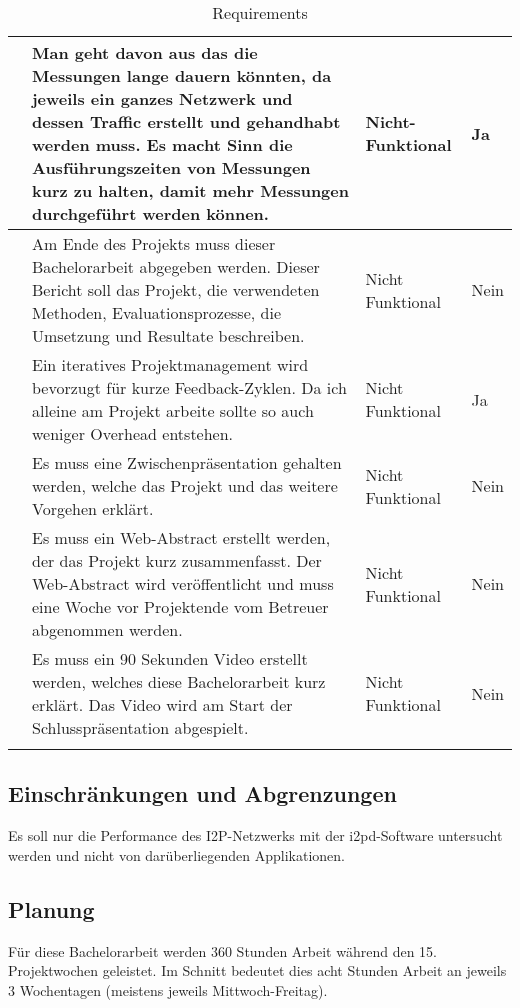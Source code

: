 \begin{longtable}{N p{8.5cm} l l}
      & Man geht davon aus das die Messungen lange dauern könnten, da jeweils ein ganzes Netzwerk und dessen Traffic erstellt und gehandhabt werden muss. Es macht Sinn die Ausführungszeiten von Messungen kurz zu halten, damit mehr Messungen durchgeführt werden können. & Nicht-Funktional & Ja \\ \midrule
      & Am Ende des Projekts muss dieser Bachelorarbeit abgegeben werden. Dieser Bericht soll das Projekt, die verwendeten Methoden, Evaluationsprozesse, die Umsetzung und Resultate beschreiben.
                & Nicht Funktional & Nein \\ \midrule
      & Ein iteratives Projektmanagement wird bevorzugt für kurze Feedback-Zyklen. Da ich alleine am Projekt arbeite sollte so auch weniger Overhead entstehen. & Nicht Funktional & Ja \\ \midrule
      & Es muss eine Zwischenpräsentation gehalten werden, welche das Projekt und das weitere Vorgehen erklärt.
                & Nicht Funktional & Nein \\ \midrule
      & Es muss ein Web-Abstract erstellt werden, der das Projekt kurz zusammenfasst. Der Web-Abstract wird veröffentlicht und muss eine Woche vor Projektende vom Betreuer abgenommen werden.
                & Nicht Funktional & Nein \\ \midrule
      & Es muss ein 90 Sekunden Video erstellt werden, welches diese Bachelorarbeit kurz erklärt. Das Video wird am Start der Schlusspräsentation abgespielt.
                & Nicht Funktional & Nein \\ \midrule
    \bottomrule
    \caption{Requirements}\label{tab:requirements}
\end{longtable}

\subsection{Einschränkungen und Abgrenzungen}

Es soll nur die Performance des I2P-Netzwerks mit der i2pd-Software untersucht werden und nicht von darüberliegenden Applikationen.


\subsection{Planung}
\label{sec:Planung}

Für diese Bachelorarbeit werden 360 Stunden Arbeit während den 15. Projektwochen geleistet.
Im Schnitt bedeutet dies acht Stunden Arbeit an jeweils 3 Wochentagen (meistens jeweils Mittwoch-Freitag).

